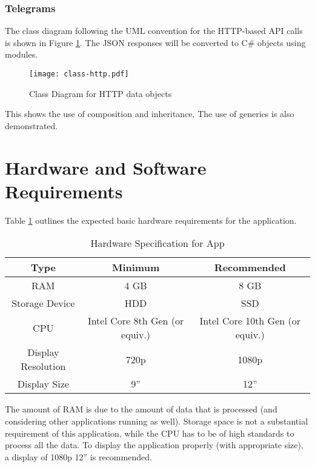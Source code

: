 \subsubsection{Telegrams}

The class diagram following the UML convention for the HTTP-based API calls is shown in Figure \ref{fig:classes-http}. The JSON responses will be converted to C\# objects using  modules.

\begin{figure}[htp]
    \centering
    \texttt{[image: class-http.pdf]}
    \caption{Class Diagram for HTTP data objects}
    \label{fig:classes-http}
\end{figure}

This shows the use of composition and inheritance. The use of generics is also demonstrated.

\section{Hardware and Software Requirements}

Table \ref{tab:hardware-spec} outlines the expected basic hardware requirements for the application.

\begin{table}[htp]
    \centering

    \begin{tabular}{ccc}
        Type               & Minimum                        & Recommended                     \\
        \hline
        RAM                & 4 GB                           & 8 GB                            \\
        Storage Device     & HDD                            & SSD                             \\
        CPU                & Intel Core 8th Gen (or equiv.) & Intel Core 10th Gen (or equiv.) \\
        Display Resolution & 720p                           & 1080p                           \\
        Display Size       & 9''                            & 12''
    \end{tabular}
    \caption{Hardware Specification for App}
    \label{tab:hardware-spec}
\end{table}

The amount of RAM is due to the amount of data that is processed (and considering other applications running as well). Storage space is not a substantial requirement of this application, while the CPU has to be of high standards to process all the data. To display the application properly (with appropriate size), a display of 1080p 12'' is recommended.

